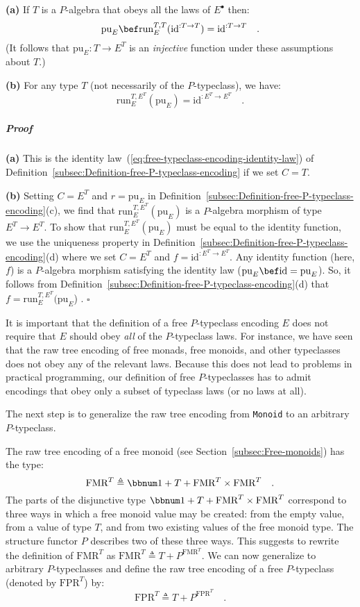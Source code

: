 \textbf{(a)} If $T$ is a $P$-algebra that obeys all the laws of
$E^{\bullet}$ then: 
\[
\text{pu}_{E}\bef\text{run}_{E}^{T,T}(\text{id}^{:T\rightarrow T})=\text{id}^{:T\rightarrow T}\quad.
\]
(It follows that $\text{pu}_{E}:T\rightarrow E^{T}$ is an \emph{injective}
function under these assumptions about $T$.)

\textbf{(b)} For any type $T$ (not necessarily of the $P$-typeclass),
we have:
\[
\text{run}_{E}^{T,E^{T}}(\text{pu}_{E})=\text{id}^{:E^{T}\rightarrow E^{T}}\quad.
\]


\subparagraph{Proof}

\textbf{(a)} This is the identity law~(\ref{eq:free-typeclass-encoding-identity-law})
of Definition~\ref{subsec:Definition-free-P-typeclass-encoding}
if we set $C=T$.

\textbf{(b)} Setting $C=E^{T}$ and $r=\text{pu}_{E}$ in Definition~\ref{subsec:Definition-free-P-typeclass-encoding}(c),
we find that $\text{run}_{E}^{T,E^{T}}(\text{pu}_{E})$ is a $P$-algebra
morphism of type $E^{T}\rightarrow E^{T}$. To show that $\text{run}_{E}^{T,E^{T}}(\text{pu}_{E})$
must be equal to the identity function, we use the uniqueness property
in Definition~\ref{subsec:Definition-free-P-typeclass-encoding}(d)
where we set $C=E^{T}$ and $f=\text{id}^{:E^{T}\rightarrow E^{T}}$.
Any identity function (here, $f$) is a $P$-algebra morphism satisfying
the identity law ($\text{pu}_{E}\bef\text{id}=\text{pu}_{E}$). So,
it follows from Definition~\ref{subsec:Definition-free-P-typeclass-encoding}(d)
that $f=\text{run}_{E}^{T,E^{T}}(\text{pu}_{E}$) . $\square$

It is important that the definition of a free $P$-typeclass encoding
$E$ does not require that $E$ should obey \emph{all} of the $P$-typeclass
laws. For instance, we have seen that the raw tree encoding of free
monads, free monoids, and other typeclasses does not obey any of the
relevant laws. Because this does not lead to problems in practical
programming, our definition of free $P$-typeclasses has to admit
encodings that obey only a subset of typeclass laws (or no laws at
all).

The next step is to generalize the raw tree encoding from \lstinline!Monoid!
to an arbitrary $P$-typeclass. 

The raw tree encoding of a free monoid (see Section~\ref{subsec:Free-monoids})
has the type: 
\[
\text{FMR}^{T}\triangleq\bbnum 1+T+\text{FMR}^{T}\times\text{FMR}^{T}\quad.
\]
The parts of the disjunctive type $\bbnum 1+T+\text{FMR}^{T}\times\text{FMR}^{T}$
correspond to three ways in which a free monoid value may be created:
from the empty value, from a value of type $T$, and from two existing
values of the free monoid type. The structure functor $P$ describes
two of these three ways. This suggests to rewrite the definition of
$\text{FMR}^{T}$ as $\text{FMR}^{T}\triangleq T+P^{\text{FMR}^{T}}$.
We can now generalize to arbitrary $P$-typeclasses and define the
raw tree encoding of a free $P$-typeclass (denoted by $\text{FPR}^{T}$)
by:
\[
\text{FPR}^{T}\triangleq T+P^{\text{FPR}^{T}}\quad.
\]


